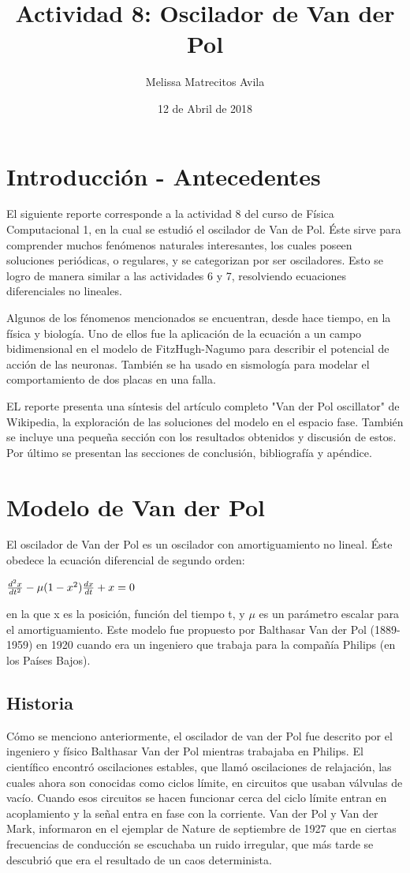 \documentclass{article}
\title{Actividad 8: Oscilador de Van der Pol}
\author{Melissa Matrecitos Avila}
\date{12 de Abril de 2018}
\begin{document}
\maketitle
\section {Introducción - Antecedentes}
El siguiente reporte corresponde a la actividad 8 del curso de Física Computacional 1, en la cual se estudió el oscilador de Van de Pol. Éste sirve para comprender muchos fenómenos naturales interesantes, los cuales poseen soluciones periódicas, o regulares, y se categorizan por ser osciladores. Esto se logro de manera similar a las actividades 6 y 7, resolviendo ecuaciones diferenciales no lineales.

Algunos de los fénomenos mencionados se encuentran, desde hace tiempo, en la física y biología. Uno de ellos fue la aplicación de la ecuación a un campo bidimensional en el modelo de FitzHugh-Nagumo para describir el potencial de acción de las neuronas. También se ha usado en sismología para modelar el comportamiento de dos placas en una falla.

EL reporte presenta una síntesis del artículo completo "Van der Pol oscillator" de  Wikipedia, la exploración de las soluciones del modelo en el espacio fase. También se incluye una pequeña sección con los resultados obtenidos y discusión de estos. Por último se presentan las secciones de conclusión, bibliografía y apéndice.

\section{Modelo de Van der Pol}
El oscilador de Van der Pol es un oscilador con amortiguamiento no lineal. Éste obedece la ecuación diferencial de segundo orden:
\begin{center}
$ {d^{2}x \over dt^{2}}-\mu (1-x^{2}){dx \over dt}+x=0$
\end {center}
en la que x es la posición, función del tiempo t, y $\mu$ es un parámetro escalar para el amortiguamiento. Este modelo fue propuesto por Balthasar Van der Pol (1889-1959) en 1920 cuando era un ingeniero que trabaja para la compañía Philips (en los Países Bajos).

\subsection {Historia}
Cómo se menciono anteriormente, el oscilador de van der Pol fue descrito por el ingeniero y físico Balthasar Van der Pol mientras trabajaba en Philips. El científico encontró oscilaciones estables, que llamó oscilaciones de relajación, las cuales ahora son conocidas como ciclos límite, en circuitos que usaban válvulas de vacío. Cuando esos circuitos se hacen funcionar cerca del ciclo límite entran en acoplamiento y la señal entra en fase con la corriente. Van der Pol y Van der Mark, informaron en el ejemplar de Nature de septiembre de 1927 que en ciertas frecuencias de conducción se escuchaba un ruido irregular, que más tarde se descubrió que era el resultado de un caos determinista.
\end{document}
